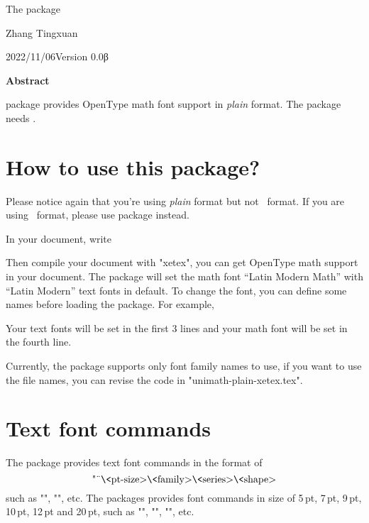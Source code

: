 \centerline{\twentyrm The 
  package}
\biggskip

\centerline{Zhang Tingxuan}
\medskip

\centerline{2022/11/06\quad Version 0.0β}
\biggskip

\centerline{\bf Abstract}
\medskip
{\sf\umpx} package provides OpenType math font support in {\it plain \tex\/} 
format. The {\sf\umpx} package needs \xetex.

\section{How to use this package?}
Please notice again that you're using {\it plain\/} format but not 
\latex\ format. If you are using \latex\ format, please use 
 package instead.

In your document, write
\begintt

\endtt
Then compile your document with "xetex", you can get OpenType math support 
in your document. The package will set the math font ``Latin Modern Math'' 
with ``Latin Modern'' text fonts in default. To change the font, you can 
define some names before loading the package. For example,
\begintt
\def\mainfontname{TeX Gyre Termes}
\def\sansfontname{TeX Gyre Heros}
\def\monofontname{TeX Gyre Cursors}
\def\mathfontname{TeX Gyre Termes Math}

\endtt
Your text fonts will be set in the first 3 lines and your math font will 
be set in the fourth line.

Currently, the package supports only font family names to use, if 
you want to use the file names, you can revise the code in 
"unimath-plain-xetex.tex".



\section{Text font commands}
The package provides text font commands in the format of 
$$\hbox{"\"\<pt-size>\<family>\<series>\<shape>}$$
such as "\tensfbfit", "\twelvebf", etc. The packages provides 
font commands in size of 5\,pt, 7\,pt, 9\,pt, 10\,pt, 12\,pt and 20\,pt, 
such as "\fiverm", "\sevensf", "\twelvett", etc.

